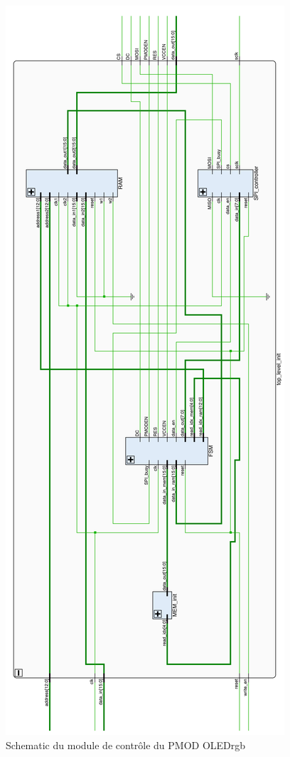 \documentclass[11pt]{article}
\begin{document}
\begin{figure}[H]
\begin{center}
\includegraphics[scale = 1.4, keepaspectratio]{schematic_OLEDrgb_manager.png}
\caption{Schematic du module de contrôle du PMOD OLEDrgb}
\end{center}
\end{figure}
\end{document}
